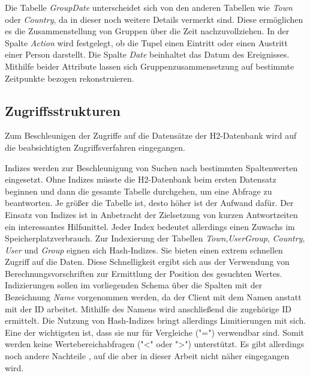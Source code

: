 Die Tabelle \textit{GroupDate} unterscheidet sich von den anderen Tabellen wie \textit{Town} oder \textit{Country}, da in dieser noch weitere Details vermerkt sind. Diese ermöglichen es die Zusammenstellung von Gruppen über die Zeit nachzuvollziehen. In der Spalte \textit{Action} wird festgelegt, ob die Tupel einen Eintritt oder einen Austritt einer Person darstellt. Die Spalte \textit{Date} beinhaltet das Datum des Ereignisses. Mithilfe beider Attribute lassen sich Gruppenzusammensetzung auf bestimmte Zeitpunkte bezogen rekonstruieren.

\subsection{Zugriffsstrukturen}

Zum Beschleunigen der Zugriffe auf die Datensätze der H2-Datenbank wird auf die beabsichtigten Zugriffsverfahren eingegangen. 

Indizes werden zur Beschleunigung von Suchen nach bestimmten Spaltenwerten eingesetzt. Ohne Indizes müsste die H2-Datenbank beim ersten Datensatz beginnen und dann die gesamte Tabelle durchgehen, um eine Abfrage zu beantworten. Je größer die Tabelle ist, desto höher ist der Aufwand dafür. Der Einsatz von Indizes ist in Anbetracht der Zielsetzung von kurzen Antwortzeiten ein interessantes Hilfsmittel. Jeder Index bedeutet allerdings einen Zuwachs im Speicherplatzverbrauch. Zur Indexierung der Tabellen \textit{Town},\textit{UserGroup}, \textit{Country}, \textit{User} und \textit{Group} eignen sich Hash-Indizes. Sie bieten einen extrem schnellen Zugriff auf die Daten. Diese Schnelligkeit ergibt sich aus der Verwendung von Berechnungsvorschriften zur Ermittlung der Position des gesuchten Wertes. Indizierungen sollen im vorliegenden Schema über die Spalten mit der Bezeichnung \textit{Name} vorgenommen werden, da der Client mit dem Namen anstatt mit der ID arbeitet. Mithilfe des Namens wird anschließend die zugehörige ID ermittelt. Die Nutzung von Hash-Indizes bringt allerdings Limitierungen mit sich. Eine der wichtigsten ist, dass sie nur für Vergleiche ("=") verwendbar sind. Somit werden keine Wertebereichabfragen ("<" oder ">") unterstützt. Es gibt allerdings noch andere Nachteile \cite{SWB-352401869}, auf die aber in dieser Arbeit nicht näher eingegangen wird. 

